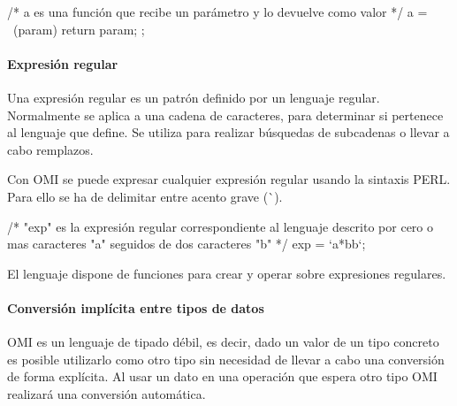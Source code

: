 \begin{myverbatim}
   /*
      a es una función que recibe un 
      parámetro y lo devuelve como valor
   */
   a = ~(param){ return param; }; 
\end{myverbatim} 



\paragraph{Expresión regular}
Una expresión regular es un patrón definido por un lenguaje regular. Normalmente se aplica a una cadena de caracteres, para 
determinar si pertenece al lenguaje que define. Se utiliza para realizar búsquedas de subcadenas o llevar a cabo remplazos.

Con OMI se puede expresar cualquier expresión regular usando la sintaxis PERL. Para ello se ha de delimitar entre acento grave (\`\ ). \\

\begin{myverbatim}
   /*
      "exp" es la expresión regular correspondiente
      al lenguaje descrito por cero o mas caracteres "a" 
      seguidos de dos caracteres "b"
   */
   exp = `a*bb`; 
\end{myverbatim} 

El lenguaje dispone de funciones para crear y operar sobre expresiones regulares.


\paragraph{Conversión implícita entre tipos de datos}\label{sec:type_iconv}
OMI es un lenguaje de tipado débil, es decir, dado un valor de un tipo concreto es posible utilizarlo como otro tipo sin necesidad de 
llevar a cabo una conversión de forma explícita. Al usar un dato en una operación que espera  otro tipo OMI realizará
una conversión automática.



